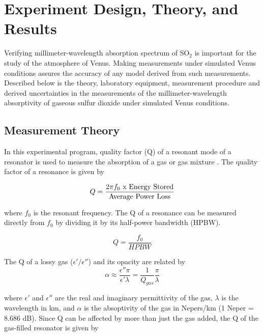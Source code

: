 \chapter{Experiment Design, Theory, and Results}

Verifying millimeter-wavelength absorption spectrum of SO$_2$ is important for the study of the atmosphere of Venus. Making measurements under simulated Venus conditions assures the accuracy of any model derived from such measurements.
 Described below is the theory, laboratory equipment, measurement procedure and derived uncertainties in the measurements of the millimeter-wavelength absorptivity of gaseous sulfur dioxide under simulated Venus conditions.

\section{Measurement Theory}

In this experimental program, quality factor (Q) of a resonant mode of a resonator is used to measure the absorption of a gas or gas mixture \cite{Hanley-2007}. The quality factor of a resonance is given by \cite{Matthael-1980}

\begin{equation} \label{eq:qlong}
Q = \frac{2\pi f_0 \textnormal{ x Energy Stored}}{\textnormal{Average Power Loss}}
\end{equation}

\noindent where $f_0$ is the resonant frequency. The Q of a resonance can be measured directly from $f_0$ by dividing it by its half-power bandwidth (HPBW).

\begin{equation} \label{eq:qshort}
Q = \frac{f_0}{HPBW}
\end{equation}

\noindent The Q of a lossy gas ($\epsilon'/\epsilon''$) and its opacity are related by
\begin{equation} \label{eq:alphaapprox}
\alpha \approx \frac{\epsilon'' \pi}{\epsilon' \lambda} = \frac{1}{Q_{gas}} \frac{\pi}{\lambda}
\end{equation}

\noindent where $\epsilon'$ and $\epsilon''$ are the real and imaginary permittivity of the gas, $\lambda$ is the wavelength in km, and $\alpha$ is the absoptivity of the gas in Nepers/km (1 Neper = 8.686 dB). Since Q can be affected by more than just the gas added, the Q of the gas-filled resonator is given by

